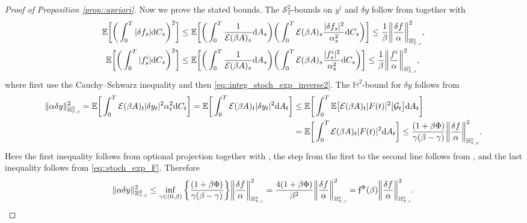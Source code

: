 \documentclass[10pt]{article} %
\newcommand\cE{\mathcal E}
\newcommand\cG{\mathcal G}
\newcommand\cS{\mathcal S}
\newcommand{\smalltext}[1]{\text{\fontsize{4}{4}\selectfont$#1$}}
\newcommand\ff{\mathfrak f}
\def \E{\mathbb{E}}
\def \H{\mathbb{H}}
\def\d{\mathrm{d}}
\begin{document}
\begin{proof}[Proof of Proposition \ref{prop::apriori}]
Now we prove the stated bounds. The $\cS^2_T$-bounds on $y^i$ and $\delta y$ follow from  together with
\begin{align*}
	\E\bigg[\bigg(\int_0^T |\delta f_s| \d C_s \bigg)^2\bigg] &\leq \E\bigg[\bigg(\int_0^T \frac{1}{\cE(\beta A)_s}\d A_s\bigg)\bigg(\int_0^T \cE(\beta A)_s\frac{|\delta f_s|^2}{\alpha^2_s} \d C_s \bigg)\bigg] \leq \frac{1}{\beta} \bigg\|\frac{\delta f}{\alpha}\bigg\|^2_{\H^\smalltext{2}_{\smalltext{T}\smalltext{,}\smalltext{\beta}}},\\
	\E\bigg[\bigg(\int_0^T |f^i_s| \d C_s \bigg)^2\bigg] &\leq \E\bigg[\bigg(\int_0^T \frac{1}{\cE(\beta A)_s}\d A_s\bigg)\bigg(\int_0^T \cE(\beta A)_s\frac{|f^i_s|^2}{\alpha^2_s} \d C_s \bigg)\bigg] \leq \frac{1}{\beta} \bigg\|\frac{f^i}{\alpha}\bigg\|^2_{\H^\smalltext{2}_{\smalltext{T}\smalltext{,}\smalltext{\beta}}},
\end{align*}
where first use the Cauchy--Schwarz inequality and then \eqref{eq::integ_stoch_exp_inverse2}.
The $\H^2$-bound for $\delta y$ follows from
\begin{align*}
	\|\alpha \delta y\|^2_{\H^2_{\smalltext{T}\smalltext{,}\smalltext{\beta}}} = \E \bigg[ \int_0^T \cE(\beta A)_t |\delta y_t|^2 \alpha^2_t \d C_t \bigg] 
	= \E \bigg[ \int_0^T \cE(\beta A)_t |\delta y_{t}|^2 \d A_t \bigg] 
&\leq \E \bigg[ \int_0^T \E \big[ \cE(\beta A)_t |F(t)|^2 \big| \cG_{t} \big] \d A_t \bigg] \\
	&= \E \bigg[ \int_0^T \cE(\beta A)_t |F(t)|^2 \d A_t \bigg]
	\leq \frac{(1+\beta\Phi)}{\gamma(\beta - \gamma)} \bigg\| \frac{\delta f}{\alpha} \bigg\|^2_{\H^{\smalltext{2}}_{\smalltext{T}\smalltext{,}\smalltext{\beta}}}.
\end{align*}
Here the first inequality follows from optional projection together with , the step from the first to the second line follows from \cite[Theorem VI.57]{dellacherie1982probabilities}, and the last inequality follows from \eqref{eq::stoch_exp_F}. Therefore
\begin{equation*}
	\|\alpha \delta y\|^2_{\H^2_{\smalltext{T}\smalltext{,}\smalltext{\beta}}} 
	\leq \inf_{\gamma \in (0,\beta)}\bigg\{\frac{(1+\beta\Phi)}{\gamma(\beta-\gamma)}\bigg\}\bigg\| \frac{\delta f}{\alpha} \bigg\|^2_{\H^{\smalltext{2}}_{\smalltext{T}\smalltext{,}\smalltext{\beta}}} = \frac{4(1+\beta\Phi)}{\beta^2}\bigg\| \frac{\delta f}{\alpha} \bigg\|^2_{\H^{\smalltext{2}}_{\smalltext{T}\smalltext{,}\smalltext{\beta}}} = \ff^\Phi(\beta) \bigg\| \frac{\delta f}{\alpha} \bigg\|^2_{\H^{\smalltext{2}}_{\smalltext{T}\smalltext{,}\smalltext{\beta}}}.
\end{equation*}


\end{proof}
\end{document}
